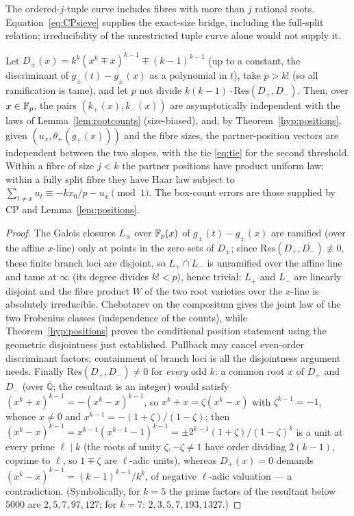 The ordered-$j$-tuple curve includes fibres with more than $j$ rational roots.
Equation~\eqref{eq:CPsieve} supplies the exact-size bridge, including the full-split relation;
irreducibility of the unrestricted tuple curve alone would not supply it.

\begin{lemma}\label{lem:twoslopes}
Let $D_\pm(x)=k^k(x^k\mp x)^{k-1}\mp(k-1)^{k-1}$ (up to a constant, the discriminant of $g_\pm(t)-g_\pm(x)$ as a polynomial in $t$), take $p>k!$ (so all ramification is tame), and let $p$ not
divide $k(k-1)\cdot\mathrm{Res}(D_+,D_-)$.  Then, over $x\in\mathbb{F}_p$, the pairs $(k_+(x),k_-(x))$ are asymptotically independent with the laws of
Lemma~\ref{lem:rootcounts} (size-biased), and, by Theorem~\ref{hyp:positions}, given $(u_x,\theta_+(g_+(x)))$ and the fibre sizes, the partner-position vectors are independent
between the two slopes, with the tie \eqref{eq:tie} for the second threshold.  Within a fibre of size $j<k$ the partner positions have product uniform law;
within a fully split fibre they have Haar law subject to
$\sum_{t\ne x}u_t\equiv-kx_0/p-u_x\pmod1$.  The box-count errors are those supplied by CP and Lemma~\ref{lem:positions}.
\end{lemma}
\begin{proof}
The Galois closures $L_\pm$ over $\mathbb{F}_p(x)$ of $g_\pm(t)-g_\pm(x)$ are ramified (over the affine $x$-line) only at points in the zero sets of $D_\pm$; since
$\mathrm{Res}(D_+,D_-)\not\equiv0$, these finite branch loci are disjoint, so $L_+\cap L_-$ is unramified over the affine line and tame at $\infty$
(its degree divides $k!<p$), hence trivial: $L_+$ and $L_-$ are linearly disjoint and the fibre product $W$ of the two root varieties over the $x$-line is
absolutely irreducible.  Chebotarev on the compositum gives the joint law of the two Frobenius classes (independence of the counts), while Theorem~\ref{hyp:positions} proves the conditional position statement using the geometric disjointness just established.  Pullback may cancel even-order discriminant factors; containment of branch loci is all the disjointness argument needs.
Finally $\mathrm{Res}(D_+,D_-)\ne0$ for \emph{every} odd $k$: a common root $x$ of $D_+$ and $D_-$ (over $\overline{\mathbb Q}$; the
resultant is an integer) would satisfy $(x^k+x)^{k-1}=-(x^k-x)^{k-1}$, so $x^k+x=\zeta(x^k-x)$ with $\zeta^{k-1}=-1$, whence $x\ne0$ and
$x^{k-1}=-(1+\zeta)/(1-\zeta)$; then $(x^k-x)^{k-1}=x^{k-1}(x^{k-1}-1)^{k-1}=\pm2^{k-1}(1+\zeta)/(1-\zeta)^{k}$ is a unit at every prime $\ell\mid k$
(the roots of unity $\zeta,-\zeta\ne1$ have order dividing $2(k-1)$, coprime to $\ell$, so $1\mp\zeta$ are $\ell$-adic units), whereas $D_+(x)=0$
demands $(x^k-x)^{k-1}=(k-1)^{k-1}/k^k$, of negative $\ell$-adic valuation — a contradiction.  (Symbolically, for $k=5$ the prime factors of the
resultant below $5000$ are $2,5,7,97,127$; for $k=7$: $2,3,5,7,193,1327$.)
\end{proof}


